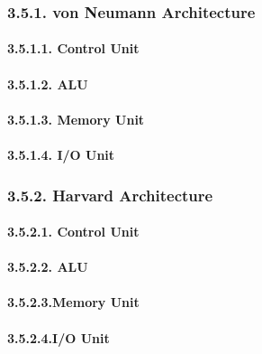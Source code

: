 \documentclass[
]{article}
\begin{document}
\hypertarget{von-neumann-architecture}{%
\subsubsection{3.5.1. von Neumann
Architecture}\label{von-neumann-architecture}}

\hypertarget{control-unit}{%
\paragraph{3.5.1.1. Control Unit}\label{control-unit}}

\hypertarget{alu}{%
\paragraph{3.5.1.2. ALU}\label{alu}}

\hypertarget{memory-unit}{%
\paragraph{3.5.1.3. Memory Unit}\label{memory-unit}}

\hypertarget{io-unit}{%
\paragraph{3.5.1.4. I/O Unit}\label{io-unit}}

\hypertarget{harvard-architecture}{%
\subsubsection{3.5.2. Harvard Architecture}\label{harvard-architecture}}

\hypertarget{control-unit-1}{%
\paragraph{3.5.2.1. Control Unit}\label{control-unit-1}}

\hypertarget{alu-1}{%
\paragraph{3.5.2.2. ALU}\label{alu-1}}

\hypertarget{memory-unit-1}{%
\paragraph{3.5.2.3.Memory Unit}\label{memory-unit-1}}

\hypertarget{io-unit-1}{%
\paragraph{3.5.2.4.I/O Unit}\label{io-unit-1}}
\end{document}
